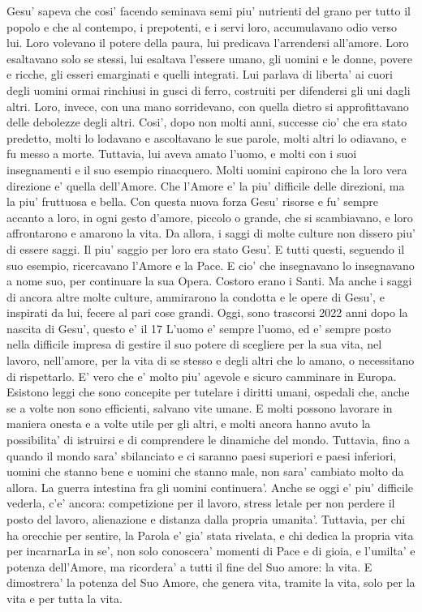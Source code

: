   Gesu' sapeva che cosi' facendo seminava semi piu' nutrienti del grano per tutto il popolo e che al contempo, i prepotenti, e i servi loro, accumulavano odio verso lui. Loro volevano il potere della paura, lui predicava l'arrendersi all'amore. Loro esaltavano solo se stessi, lui esaltava l'essere umano, gli uomini e le donne, povere e ricche, gli esseri emarginati e quelli integrati. Lui parlava di liberta' ai cuori degli uomini ormai rinchiusi in gusci di ferro, costruiti per difendersi gli uni dagli altri. Loro, invece, con una mano sorridevano, con quella dietro si approfittavano delle debolezze degli altri.
  Cosi', dopo non molti anni, successe cio' che era stato predetto, molti lo lodavano e ascoltavano le sue parole, molti altri lo odiavano, e fu messo a morte.
  Tuttavia, lui aveva amato l'uomo, e molti con i suoi insegnamenti e il suo esempio rinacquero. Molti uomini capirono che la loro vera direzione e' quella dell'Amore. Che l'Amore e' la piu' difficile delle direzioni, ma la piu' fruttuosa e bella. Con questa nuova forza Gesu' risorse e fu' sempre accanto a loro, in ogni gesto d'amore, piccolo o grande, che si scambiavano, e loro affrontarono e amarono la vita.
  Da allora, i saggi di molte culture non dissero piu' di essere saggi. Il piu' saggio per loro era stato Gesu'. E tutti questi, seguendo il suo esempio, ricercavano l'Amore e la Pace. E cio' che insegnavano lo insegnavano a nome suo, per continuare la sua Opera. Costoro erano i Santi. Ma anche i saggi di ancora altre molte culture, ammirarono la condotta e le opere di Gesu', e inspirati da lui, fecere al pari cose grandi.
  Oggi, sono trascorsi 2022 anni dopo la nascita di Gesu', questo e' il 17%
  L'uomo e' sempre l'uomo, ed e' sempre posto nella difficile impresa di gestire il suo potere di scegliere per la sua vita, nel lavoro, nell'amore, per la vita di se stesso e degli altri che lo amano, o necessitano di rispettarlo. 
E' vero che e' molto piu' agevole e sicuro camminare in Europa. Esistono leggi che sono concepite per tutelare i diritti umani, ospedali che, anche se a volte non sono efficienti, salvano vite umane. E molti possono lavorare in maniera onesta e a volte utile per gli altri, e molti ancora hanno avuto la possibilita' di istruirsi e di comprendere le dinamiche del mondo.
Tuttavia, fino a quando il mondo sara' sbilanciato e ci saranno paesi superiori e paesi inferiori, uomini che stanno bene e uomini che stanno male, non sara' cambiato molto da allora. La guerra intestina fra gli uomini continuera'. Anche se oggi e' piu' difficile vederla, c'e' ancora: competizione per il lavoro, stress letale per non perdere il posto del lavoro, alienazione e distanza dalla propria umanita'.
  Tuttavia, per chi ha orecchie per sentire, la Parola e' gia' stata rivelata, e chi dedica la propria vita per incarnarLa in se', non solo conoscera' momenti di Pace e di gioia, e l'umilta' e potenza dell'Amore, ma ricordera' a tutti il fine del Suo amore: la vita. E dimostrera' la potenza del Suo Amore, che genera vita, tramite la vita, solo per la vita e per tutta la vita.

